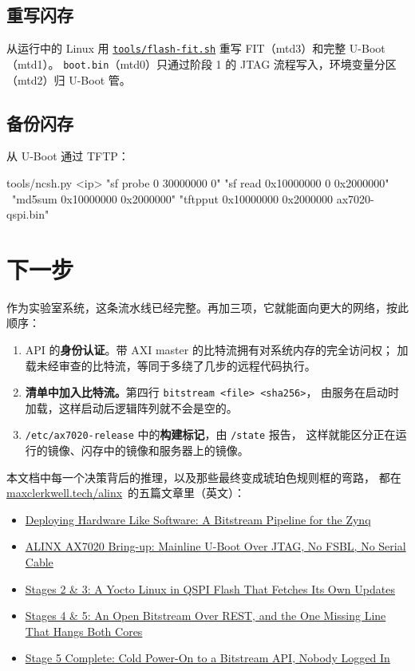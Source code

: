 \documentclass[11pt,a4paper,oneside]{article}
\newcommand{\file}[1]{{\color{bluemid}\nolinkurl{#1}}}
\newcommand{\cmd}[1]{\texttt{#1}}
\newcommand{\repo}{https://github.com/MaxClerkwell/ax7020-bringup}
\newcommand{\rfile}[1]{\href{\repo/blob/master/#1}{\color{bluemid}\nolinkurl{#1}}}
\newcommand{\blog}[2]{\href{https://maxclerkwell.tech/posts/#1/}{#2}}
\newcommand{\series}{\href{https://maxclerkwell.tech/alinx/}{maxclerkwell.tech/alinx}}
\begin{document}
\subsection{重写闪存}

从运行中的 Linux 用 \rfile{tools/flash-fit.sh} 重写 FIT（mtd3）和完整 U-Boot（mtd1）。
\file{boot.bin}（mtd0）只通过阶段 1 的 JTAG 流程写入，环境变量分区（mtd2）归 U-Boot 管。

\subsection{备份闪存}

从 U-Boot 通过 TFTP：

\begin{shell}
tools/ncsh.py <ip> "sf probe 0 30000000 0" "sf read 0x10000000 0 0x2000000" \
  "md5sum 0x10000000 0x2000000" "tftpput 0x10000000 0x2000000 ax7020-qspi.bin"
\end{shell}

\section{下一步}

作为实验室系统，这条流水线已经完整。再加三项，它就能面向更大的网络，按此顺序：

\begin{enumerate}
  \item API 的\textbf{身份认证}。带 AXI master 的比特流拥有对系统内存的完全访问权；
        加载未经审查的比特流，等同于多绕了几步的远程代码执行。
  \item \textbf{清单中加入比特流。}第四行 \cmd{bitstream <file> <sha256>}，
        由服务在启动时加载，这样启动后逻辑阵列就不会是空的。
  \item \file{/etc/ax7020-release} 中的\textbf{构建标记}，由 \file{/state} 报告，
        这样就能区分正在运行的镜像、闪存中的镜像和服务器上的镜像。
\end{enumerate}

本文档中每一个决策背后的推理，以及那些最终变成琥珀色规则框的弯路，
都在 \series\ 的五篇文章里（英文）：

\begin{itemize}
  \item \blog{zynq-bitstream-deployment-concept-august-2026}{Deploying Hardware Like Software: A Bitstream Pipeline for the Zynq}
  \item \blog{alinx-bring-up-jtag-detected-without-power-august-2026}{ALINX AX7020 Bring-up: Mainline U-Boot Over JTAG, No FSBL, No Serial Cable}
  \item \blog{alinx-ax7020-yocto-linux-qspi-august-2026}{Stages 2 \& 3: A Yocto Linux in QSPI Flash That Fetches Its Own Updates}
  \item \blog{alinx-ax7020-open-bitstream-rest-api-september-2026}{Stages 4 \& 5: An Open Bitstream Over REST, and the One Missing Line That Hangs Both Cores}
  \item \blog{alinx-ax7020-cold-boot-to-bitstream-api-september-2026}{Stage 5 Complete: Cold Power-On to a Bitstream API, Nobody Logged In}
\end{itemize}
\end{document}
